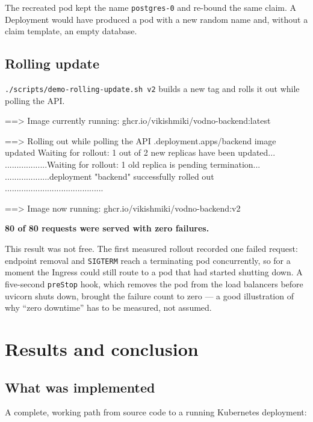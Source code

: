 \documentclass[10pt,a4paper]{article}
\newcommand{\cd}[1]{\texttt{\small #1}}
\begin{document}
The recreated pod kept the name \cd{postgres-0} and re-bound the same claim. A
Deployment would have produced a pod with a new random name and, without a
claim template, an empty database.

\subsection{Rolling update}

\cd{./scripts/demo-rolling-update.sh v2} builds a new tag and rolls it out
while polling the API.

\begin{code}
==> Image currently running:  ghcr.io/vikishmiki/vodno-backend:latest

==> Rolling out while polling the API
.deployment.apps/backend image updated
Waiting for rollout: 1 out of 2 new replicas have been updated...
..................Waiting for rollout: 1 old replica is pending termination...
...................deployment "backend" successfully rolled out
..........................................

==> Image now running:  ghcr.io/vikishmiki/vodno-backend:v2
\end{code}

\textbf{80 of 80 requests were served with zero failures.}

This result was not free. The first measured rollout recorded one failed
request: endpoint removal and \cd{SIGTERM} reach a terminating pod
concurrently, so for a moment the Ingress could still route to a pod that had
started shutting down. A five-second \cd{preStop} hook, which removes the pod
from the load balancers before uvicorn shuts down, brought the failure count
to zero --- a good illustration of why ``zero downtime'' has to be measured,
not assumed.

\section{Results and conclusion}

\subsection{What was implemented}

A complete, working path from source code to a running Kubernetes deployment:
\end{document}
